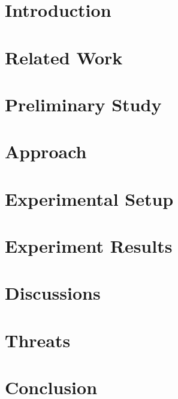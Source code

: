 \mainmatter
\chapter{Introduction}
\thispagestyle{fancy}
\bigskip


\clearpage
\chapter{Related Work}
\thispagestyle{fancy}
\bigskip


\clearpage
\chapter{Preliminary Study}
\thispagestyle{fancy}
\bigskip


\clearpage
\chapter{Approach}
\thispagestyle{fancy}
\bigskip


\clearpage
\chapter{Experimental Setup}
\thispagestyle{fancy}
\bigskip


\clearpage
\chapter{Experiment Results}
\thispagestyle{fancy}
\bigskip


\clearpage
\chapter{Discussions}
\thispagestyle{fancy}
\bigskip


\clearpage
\chapter{Threats}
\thispagestyle{fancy}
\bigskip


\clearpage
\chapter{Conclusion}
\thispagestyle{fancy}
\bigskip


